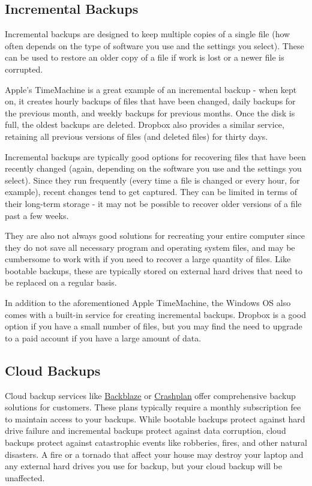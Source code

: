 \documentclass[]{book}
\theoremstyle{definition}
\theoremstyle{definition}
\theoremstyle{definition}
\theoremstyle{remark}
\begin{document}
\subsection{Incremental Backups}\label{incremental-backups}

Incremental backups are designed to keep multiple copies of a single
file (how often depends on the type of software you use and the settings
you select). These can be used to restore an older copy of a file if
work is lost or a newer file is corrupted.

Apple's TimeMachine is a great example of an incremental backup - when
kept on, it creates hourly backups of files that have been changed,
daily backups for the previous month, and weekly backups for previous
months. Once the disk is full, the oldest backups are deleted. Dropbox
also provides a similar service, retaining all previous versions of
files (and deleted files) for thirty days.

Incremental backups are typically good options for recovering files that
have been recently changed (again, depending on the software you use and
the settings you select). Since they run frequently (every time a file
is changed or every hour, for example), recent changes tend to get
captured. They can be limited in terms of their long-term storage - it
may not be possible to recover older versions of a file past a few
weeks.

They are also not always good solutions for recreating your entire
computer since they do not save all necessary program and operating
system files, and may be cumbersome to work with if you need to recover
a large quantity of files. Like bootable backups, these are typically
stored on external hard drives that need to be replaced on a regular
basis.

In addition to the aforementioned Apple TimeMachine, the Windows OS also
comes with a built-in service for creating incremental backups. Dropbox
is a good option if you have a small number of files, but you may find
the need to upgrade to a paid account if you have a large amount of
data.

\subsection{Cloud Backups}\label{cloud-backups}

Cloud backup services like \href{https://www.backblaze.com}{Backblaze}
or \href{https://www.code42.com/crashplan/}{Crashplan} offer
comprehensive backup solutions for customers. These plans typically
require a monthly subscription fee to maintain access to your backups.
While bootable backups protect against hard drive failure and
incremental backups protect against data corruption, cloud backups
protect against catastrophic events like robberies, fires, and other
natural disasters. A fire or a tornado that affect your house may
destroy your laptop and any external hard drives you use for backup, but
your cloud backup will be unaffected.
\end{document}

